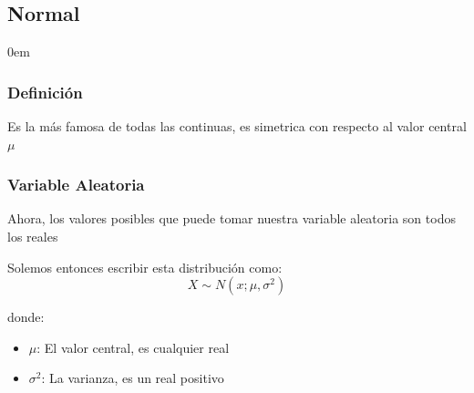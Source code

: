 \documentclass[12pt, fleqn]{report}                             %
\newenvironment{SmallIndentation}[1][0.75em]                    %
        {\begin{adjustwidth}{#1}{}\begin{footnotesize}}             %
        {\end{footnotesize}\end{adjustwidth}}                       %
\theoremstyle{break}                                            %
\begin{document}
            \clearpage
            \subsection{Normal}

                \begin{multicols}{2}
                \begin{SmallIndentation}[0em]

                    \subsubsection{Definición}

                        Es la más famosa de todas las continuas, es simetrica con respecto al valor
                        central $\mu$

                        \vspace{1em}
                        \subsubsection{Variable Aleatoria}

                            Ahora, los valores posibles que puede tomar nuestra variable aleatoria
                            son todos los reales

                            Solemos entonces escribir esta distribución como:
                            \begin{equation*}
                                X \sim N(x; \mu, \sigma^2)
                            \end{equation*}

                            donde:
                            \begin{itemize}
                                \item $\mu$: El valor central, es cualquier real
                                \item $\sigma^2$: La varianza, es un real positivo
                            \end{itemize}


\end{SmallIndentation}
\end{multicols}
\end{document}
